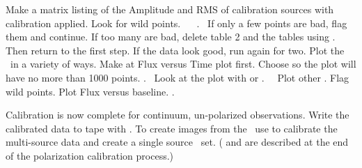 \begin{description}
 Make a matrix listing of the Amplitude and RMS of
calibration sources with calibration applied.  Look for wild points.~
~
.~
If only a few points are bad, flag them and continue.
If too many are bad, delete \CL table 2 and the \SN
tables using .
Then return to the first  step.
If the data look good, run  again for \IF two.
 Plot the \uvdata\ in a variety of ways.  Make at Flux
versus Time plot first.
Choose  so the plot will have no more
than 1000 points.
.~
Look at the plot with  or .~~
Plot other \IF. Flag wild points. Plot Flux versus baseline.
.
\eeddes

Calibration is now complete for continuum, un-polarized observations.
Write the calibrated data to tape with .
To create images from the \uvdata\ use  to calibrate
the multi-source data and create a single source \uvdata\ set.
( and  are described at the end of the
polarization calibration process.)


\end{description}
